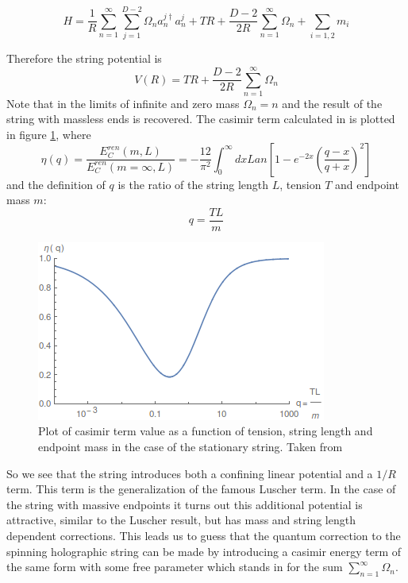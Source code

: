 \documentclass[11pt,a4paper]{article}
\begin{document}
\begin{equation}
H=\frac{1}{R}\sum_{n=1}^{\infty}\sum_{j=1}^{D-2}\Omega_n a_n^{j\dagger}a_n^j+TR+\frac{D-2}{2R}\sum_{n=1}^\infty \Omega_n+\sum_{i=1,2} m_i
\end{equation}

Therefore the string potential is
\begin{equation}
\label{eq:stringpotential}
V\left(R\right)=TR+\frac{D-2}{2R}\sum_{n=1}^\infty \Omega_n
\end{equation}
Note that in the limits of infinite and zero mass $\Omega_n=n$ and the result of the string with massless ends is recovered.
The casimir term calculated in \cite{Lambiase96} is plotted in figure \ref{fig:casimir}, where
\begin{equation}
\eta(q)=\frac{E_C^{ren}(m,L)}{E_C^{ren}(m=\infty,L)}=-\frac{12}{\pi^2}\int_0^\infty dx Lan\left[1-e^{-2x}\left(\frac{q-x}{q+x}\right)^2\right]
\end{equation}
and the definition of $q$ is the ratio of the string length $L$, tension $T$ and endpoint mass $m$:
\begin{equation}
q=\frac{TL}{m}
\end{equation}
\begin{figure}[h]
\centering
\includegraphics[scale=0.7]{figures/casimirPlot.png}
\caption{Plot of casimir term value as a function of tension, string length and endpoint mass in the case of the stationary string. Taken from \cite{Lambiase96}}
\label{fig:casimir}
\end{figure}

So we see that the string introduces both a confining linear potential and a $1/R$ term. This term is the generalization of the famous Luscher term. In the case of the string with massive endpoints it turns out this additional potential is attractive, similar to the Luscher result, but has mass and string length dependent corrections. This leads us to guess that the quantum correction to the spinning holographic string can be made by introducing a casimir energy term of the same form with some free parameter which stands in for the sum $\sum_{n=1}^\infty \Omega_n$.
\end{document}
